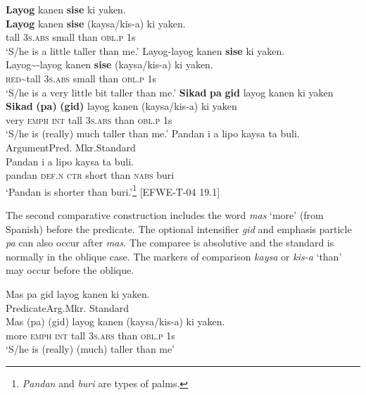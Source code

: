 \ea
\label{bkm:Ref107407647}
\textbf{Layog}  kanen  \textbf{sise}  ki  yaken. \\\smallskip \gll \textbf{Layog}  kanen  \textbf{sise}  (kaysa/kis-a)  ki  yaken. \\
tall  3\textsc{s.abs}  small  than  \textsc{obl.p}  1s \\
\glt ‘S/he is a little taller than me.’
\z
\ea
Layog-layog kanen \textbf{sise} ki yaken. \\\smallskip \gll Layog\sim{}-layog kanen \textbf{sise} (kaysa/kis-a) ki yaken. \\
\textsc{red}\sim{}tall  3\textsc{s.abs}  small  than  \textsc{obl.p}  1s \\
\glt ‘S/he is a very little bit taller than me.’
\z
\ea
\label{bkm:Ref107821212}
\textbf{Sikad}  \textbf{pa}  \textbf{gid}  layog  kanen  ki  yaken \\\smallskip \gll \textbf{Sikad}  \textbf{(pa)}  \textbf{(gid)}  layog  kanen  (kaysa/kis-a)  ki  yaken \\
very  \textsc{emph}  \textsc{int}  tall  3\textsc{s.abs}  than  \textsc{obl.p}  1s \\
\glt ‘S/he is (really) much taller than me.'
\z
\ea
Pandan  i  a  lipo    kaysa  ta  buli. \\\smallskip
 Argument\hspace{1.3cm}Pred.  Mkr.\hspace{.3cm}Standard \\
\gll Pandan  i  a  lipo    kaysa  ta  buli. \\
pandan  \textsc{def.n}  \textsc{ctr}  short    than  \textsc{nabs}  buri \\
\glt ‘Pandan is shorter than buri.'\footnote{\textit{Pandan} and \textit{buri} are types of palms.} [EFWE-T-04 19.1]
\z

The second comparative construction includes the word \textit{mas} ‘more’ (from Spanish) before the predicate. The optional intensifier \textit{gid} and emphasis particle \textit{pa} can also occur after \textit{mas}. The comparee is absolutive and the standard is normally in the oblique case. The markers of comparison \textit{kaysa} or \textit{kis-a} ‘than’ may occur before the oblique.

\ea
Mas  pa  gid  layog  kanen    ki  yaken. \\\smallskip
Predicate\hspace{2.2cm}Arg.\hspace{.3cm}Mkr.\hspace{1.2cm}  Standard \\
\gll Mas  (pa)  (gid)  layog  kanen    (kaysa/kis-a)  ki  yaken. \\
more  \textsc{emph}  \textsc{int}  tall  3\textsc{s.abs}    than  \textsc{obl.p}  1s \\
\glt ‘S/he is (really) (much) taller than me’
\z


